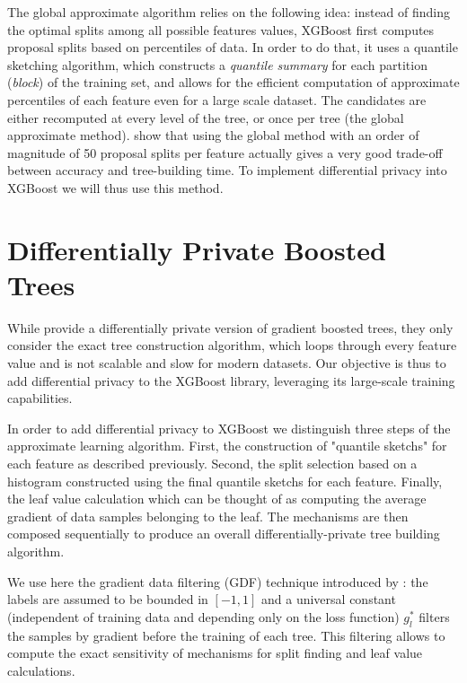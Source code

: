 \documentclass{article}
\theoremstyle{definition}
\begin{document}
The global approximate algorithm relies on the following idea: instead of finding the optimal splits among all possible features values,
XGBoost first computes proposal splits based on percentiles of data. In order to do that, it uses a quantile sketching algorithm, which constructs a \textit{quantile summary} 
for each partition (\textit{block}) of the training set, and allows for the efficient computation of approximate percentiles of each feature even for a large scale dataset.
The candidates are either recomputed at every level of the tree, or once per tree (the global approximate method).
\cite{chen2016xgboost} show that using the global method with an order of magnitude of 50 proposal splits per feature actually gives a very good trade-off between accuracy and tree-building time.
To implement differential privacy into XGBoost we will thus use this method. 

\section{Differentially Private Boosted Trees} 

While \cite{li2020privacy} provide a differentially private version of gradient boosted trees, they only consider the exact tree construction algorithm,
which loops through every feature value and is not scalable and slow for modern datasets. Our objective is thus to add differential privacy to the XGBoost library,
leveraging its large-scale training capabilities. 

In order to add differential privacy to XGBoost we distinguish three steps of the approximate learning algorithm. First, the 
construction of "quantile sketchs" for each feature as described previously. Second, the split selection based on a histogram
constructed using the final quantile sketchs for each feature. Finally, the leaf value calculation which can be thought of as computing
the average gradient of data samples belonging to the leaf. The mechanisms are then composed sequentially to produce an overall differentially-private tree building algorithm.

We use here the gradient data filtering (GDF) technique introduced by \cite{li2020privacy}:
the labels are assumed to be bounded in $[-1,1]$ and a universal constant (independent of training data and depending only on the loss function)
$g_l^{*}$ filters the samples by gradient before the training of each tree.
This filtering allows to compute the exact sensitivity of mechanisms for split finding and leaf value calculations.
\end{document}
